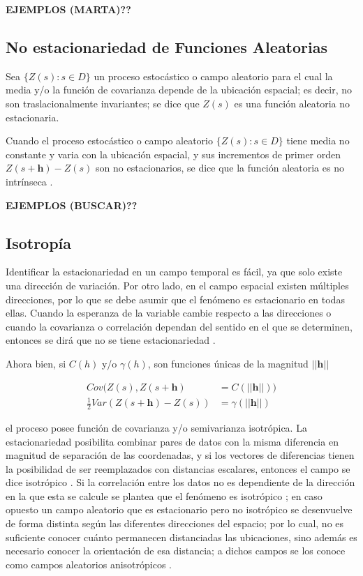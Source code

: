 \documentclass[
]{book}
\begin{document}
\textbf{EJEMPLOS (MARTA)??}

\hypertarget{no-estacionariedad-de-funciones-aleatorias}{%
\subsection{No estacionariedad de Funciones Aleatorias}\label{no-estacionariedad-de-funciones-aleatorias}}

Sea \(\{Z(s): s\in D\}\) un proceso estocástico o campo aleatorio para el cual la media y/o la función de covarianza depende de la ubicación espacial; es decir, no son traslacionalmente invariantes; se dice que \(Z(s)\) es una función aleatoria no estacionaria.

Cuando el proceso estocástico o campo aleatorio \(\{Z(s): s\in D\}\) tiene media no constante y varia con la ubicación espacial, y sus incrementos de primer orden \(Z(s+\textbf{h})-Z(s)\) son no estacionarios, se dice que la función aleatoria es no intrínseca \citep{montero}.

\textbf{EJEMPLOS (BUSCAR)??}

\hypertarget{isotropuxeda}{%
\subsection{Isotropía}\label{isotropuxeda}}

Identificar la estacionariedad en un campo temporal es fácil, ya que solo existe una dirección de variación. Por otro lado, en el campo espacial existen múltiples direcciones, por lo que se debe asumir que el fenómeno es estacionario en todas ellas. Cuando la esperanza de la variable cambie respecto a las direcciones o cuando la covarianza o correlación dependan del sentido en el que se determinen, entonces se dirá que no se tiene estacionariedad \citep{Ramon}.

Ahora bien, si \(C(h)\) y/o \(\gamma(h)\), son funciones únicas de la magnitud \(||\textbf{h}||\)

\begin{align*}
    Cov(Z(s),Z(s+\textbf{h})&= C(||\textbf{h}||))\\
    \frac{1}{2} Var(Z(s+\textbf{h})-Z(s))&=\gamma(||\textbf{h}||)
\end{align*}

el proceso posee función de covarianza y/o semivarianza isotrópica. La estacionariedad posibilita combinar pares de datos con la misma diferencia en magnitud de separación de las coordenadas, y si los vectores de diferencias tienen la posibilidad de ser reemplazados con distancias escalares, entonces el campo se dice isotrópico \citep{marta}. Si la correlación entre los datos no es dependiente de la dirección en la que esta se calcule se plantea que el fenómeno es isotrópico \citep{Ramon}; en caso opuesto un campo aleatorio que es estacionario pero no isotrópico se desenvuelve de forma distinta según las diferentes direcciones del espacio; por lo cual, no es suficiente conocer cuánto permanecen distanciadas las ubicaciones, sino además es necesario conocer la orientación de esa distancia; a dichos campos se los conoce como campos aleatorios anisotrópicos \citep{marta}.
\end{document}
